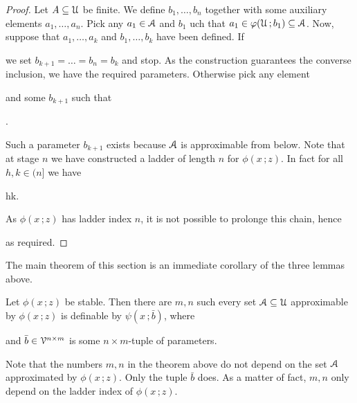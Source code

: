 \documentclass[scombinatorics.tex]{subfiles}
\begin{document}
\begin{proof}
  Let $A\subseteq\EuScript U$ be finite.
  We define $b_1,\dots,b_n$  together with some auxiliary
  elements $a_1,\dots,a_n$.
  Pick any $a_1\in\EuScript A$ and $b_1$ uch that $a_1\in\varphi(\EuScript U\,;b_1)\subseteq\EuScript A$.
  Now, suppose that $a_1,\dots,a_k$ and $b_1,\dots,b_k$ have been defined.
  If 
  

  we set $b_{k+1}=\dots=b_n=b_k$ and stop.
  As the construction guarantees the converse inclusion, we have the required parameters.
  Otherwise pick any element


  and some $b_{k+1}$ such that

  .

  Such a parameter $b_{k+1}$ exists because $\EuScript A$ is approximable from below.
  Note that at stage $n$ we have constructed a ladder of length $n$ for $\phi(x\,;z)$.
  In fact for all $h,k\in(n]$ we have
  
  {\IFF}
  {h\le k.}\hfill
  
  As $\phi(x\,;z)$ has ladder index $n$, it is not possible to prolonge this chain, hence


  as required.
\end{proof}
  
The main theorem of this section is an immediate corollary of the three lemmas above.

\begin{theorem}\label{thm_stable_definability}
  Let $\phi(x\,;z)$ be stable.
  Then there are $m, n$ such every set $\EuScript A\subseteq\EuScript U$ approximable by $\phi(x\,;z)$ is definable by $\psi(x\,;\bar b)$, where

  
  and $\bar b\in\EuScript V^{n\times m}$ is some $n{\times}m$-tuple of parameters.\QED
\end{theorem}

Note that the numbers $m,n$ in the theorem above do not depend on the set $\EuScript A$ approximated by $\phi(x\,;z)$.
Only the tuple $\bar b$ does.
As a matter of fact, $m,n$ only depend on the ladder index of $\phi(x\,;z)$.
\end{document}
